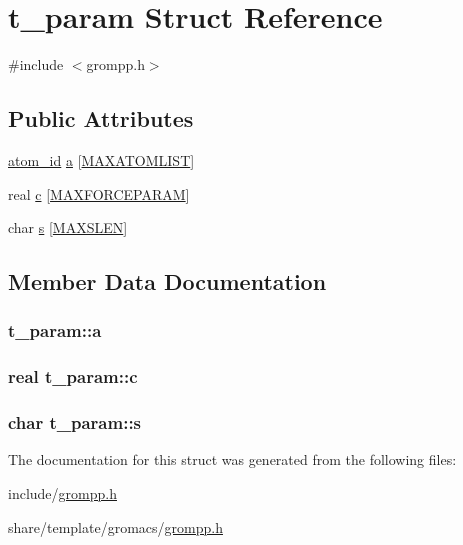 \hypertarget{structt__param}{\section{t\-\_\-param \-Struct \-Reference}
\label{structt__param}
}


{\ttfamily \#include $<$grompp.\-h$>$}

\subsection*{\-Public \-Attributes}
\begin{DoxyCompactItemize}
\item 
\hyperlink{include_2types_2simple_8h_ad3f47cdb48677e516e2049719612c737}{atom\-\_\-id} \hyperlink{structt__param_afda2dc0a37a93de8cf831ba94cf52bf4}{a} \mbox{[}\hyperlink{share_2template_2gromacs_2types_2idef_8h_aaccd7b6c82931775c7108582e75c3e6e}{\-M\-A\-X\-A\-T\-O\-M\-L\-I\-S\-T}\mbox{]}
\item 
real \hyperlink{structt__param_a78bbb30fd5252ff44ba6ac65f8468896}{c} \mbox{[}\hyperlink{share_2template_2gromacs_2types_2idef_8h_aa485bece733ea79b0527f4a8b61c8f38}{\-M\-A\-X\-F\-O\-R\-C\-E\-P\-A\-R\-A\-M}\mbox{]}
\item 
char \hyperlink{structt__param_af8510dfd333b1fddbde6acd713c947a8}{s} \mbox{[}\hyperlink{share_2template_2gromacs_2grompp_8h_a1b8bfc1abb1ba53bcc6c516ddf02ad97}{\-M\-A\-X\-S\-L\-E\-N}\mbox{]}
\end{DoxyCompactItemize}


\subsection{\-Member \-Data \-Documentation}
\hypertarget{structt__param_afda2dc0a37a93de8cf831ba94cf52bf4}{
\subsubsection[{a}]{ {\bf t\-\_\-param\-::a}}}\label{structt__param_afda2dc0a37a93de8cf831ba94cf52bf4}
\hypertarget{structt__param_a78bbb30fd5252ff44ba6ac65f8468896}{
\subsubsection[{c}]{\setlength{\rightskip}{0pt plus 5cm}real {\bf t\-\_\-param\-::c}}}\label{structt__param_a78bbb30fd5252ff44ba6ac65f8468896}
\hypertarget{structt__param_af8510dfd333b1fddbde6acd713c947a8}{
\subsubsection[{s}]{\setlength{\rightskip}{0pt plus 5cm}char {\bf t\-\_\-param\-::s}}}\label{structt__param_af8510dfd333b1fddbde6acd713c947a8}


\-The documentation for this struct was generated from the following files\-:\begin{DoxyCompactItemize}
\item 
include/\hyperlink{include_2grompp_8h}{grompp.\-h}\item 
share/template/gromacs/\hyperlink{share_2template_2gromacs_2grompp_8h}{grompp.\-h}\end{DoxyCompactItemize}

